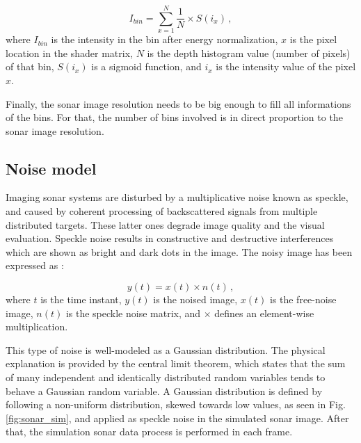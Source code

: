 \documentclass[final,5p,times]{elsarticle}
\begin{document}
\begin{equation}
    \label{eq:1}
    I_{bin} = \sum\limits_{x=1}^N \frac{1}{N} \times S(i_{x}) \, ,
\end{equation}
where $I_{bin}$ is the intensity in the bin after energy normalization, $x$ is the pixel location in the shader matrix, $N$ is the depth histogram value (number of pixels) of that bin, $S(i_{x})$ is a sigmoid function, and $i_{x}$ is the intensity value of the pixel $x$.

Finally, the sonar image resolution needs to be big enough to fill all informations of the bins. For that, the number of bins involved is in direct proportion to the sonar image resolution.


\subsection{Noise model}
\label{dev:noise}

Imaging sonar systems are disturbed by a multiplicative noise known as speckle, and caused by coherent processing of backscattered signals from multiple distributed targets. These latter ones degrade image quality and the visual evaluation. Speckle noise results in constructive and destructive interferences which are shown as bright and dark dots in the image. The noisy image has been expressed as \cite{lee1980}:

\begin{equation}
\label{eq:2}
y(t) = x(t) \times n(t) \, ,
\end{equation}
where $t$ is the time instant, $y(t)$ is the noised image, $x(t)$ is the free-noise image, $n(t)$ is the speckle noise matrix, and $\times$ defines an element-wise multiplication.

This type of noise is well-modeled as a Gaussian distribution. The physical explanation is provided by the central limit theorem, which states that the sum of many independent and identically distributed random variables tends to behave a Gaussian random variable. A Gaussian distribution is defined by following a non-uniform distribution, skewed towards low values, as seen in Fig. \ref{fig:sonar_sim}, and applied as speckle noise in the simulated sonar image. After that, the simulation sonar data process is performed in each frame.
\end{document}

